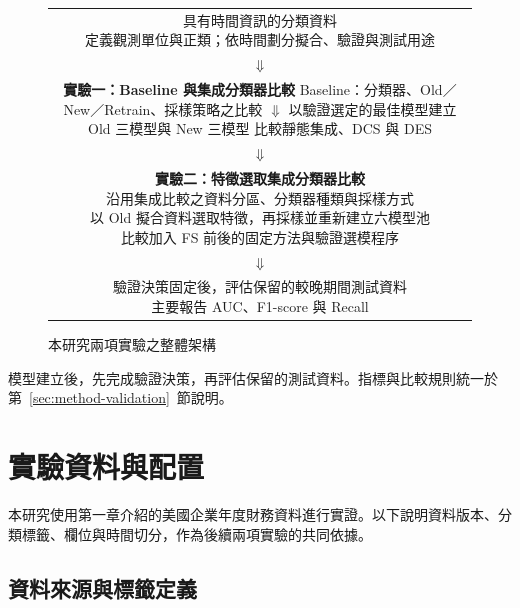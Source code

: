 \begin{figure}[htbp]
\centering
\begingroup
\small
{}
\setlength{\fboxsep}{8pt}
\begin{tabular}{@{}c@{}}
\fbox{\parbox{0.88\linewidth}{\centering 具有時間資訊的分類資料\\
定義觀測單位與正類；依時間劃分擬合、驗證與測試用途}}\\[3pt]
\(\Downarrow\)\\[3pt]
\fbox{\parbox{0.88\linewidth}{\centering\textbf{實驗一：Baseline 與集成分類器比較}\\[4pt]
Baseline：分類器、Old／New／Retrain、採樣策略之比較\\
\(\Downarrow\)\\
以驗證選定的最佳模型建立 Old 三模型與 New 三模型\\
比較靜態集成、DCS 與 DES}}\\[3pt]
\(\Downarrow\)\\[3pt]
\fbox{\parbox{0.88\linewidth}{\centering\textbf{實驗二：特徵選取集成分類器比較}\\[4pt]
沿用集成比較之資料分區、分類器種類與採樣方式\\
以 Old 擬合資料選取特徵，再採樣並重新建立六模型池\\
比較加入 FS 前後的固定方法與驗證選模程序}}\\[3pt]
\(\Downarrow\)\\[3pt]
\fbox{\parbox{0.88\linewidth}{\centering 驗證決策固定後，評估保留的較晚期間測試資料\\
主要報告 AUC、F1-score 與 Recall}}
\end{tabular}
\endgroup
\caption{本研究兩項實驗之整體架構}\label{fig:method-overview}
\par{}
\end{figure}

模型建立後，先完成驗證決策，再評估保留的測試資料。指標與比較規則統一於第~\ref{sec:method-validation}~節說明。

\clearpage
\section{實驗資料與配置}\label{sec:method-data}

本研究使用第一章介紹的美國企業年度財務資料進行實證。以下說明資料版本、分類標籤、欄位與時間切分，作為後續兩項實驗的共同依據。

\subsection{資料來源與標籤定義}\label{sec:method-label}

